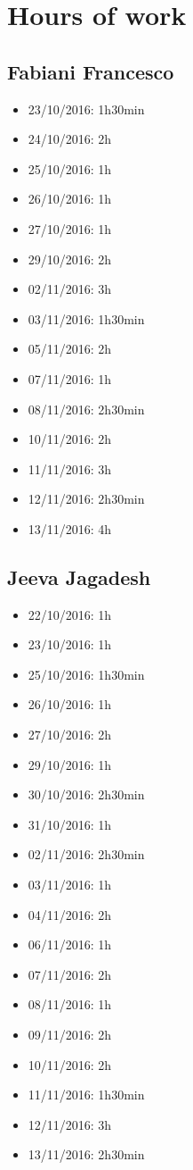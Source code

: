 \chapter{Hours of work}

\section*{Fabiani Francesco}
\begin{itemize}
	\item 23/10/2016: 1h30min
	\item 24/10/2016: 2h
	\item 25/10/2016: 1h
	\item 26/10/2016: 1h
	\item 27/10/2016: 1h
	\item 29/10/2016: 2h
	\item 02/11/2016: 3h
	\item 03/11/2016: 1h30min
	\item 05/11/2016: 2h
	\item 07/11/2016: 1h
	\item 08/11/2016: 2h30min
	\item 10/11/2016: 2h
	\item 11/11/2016: 3h
	\item 12/11/2016: 2h30min
	\item 13/11/2016: 4h
\end{itemize}

\section*{Jeeva Jagadesh}
\begin{itemize}
	\item 22/10/2016: 1h
	\item 23/10/2016: 1h
	\item 25/10/2016: 1h30min
	\item 26/10/2016: 1h
	\item 27/10/2016: 2h
	\item 29/10/2016: 1h
	\item 30/10/2016: 2h30min
	\item 31/10/2016: 1h
	\item 02/11/2016: 2h30min
	\item 03/11/2016: 1h
	\item 04/11/2016: 2h
	\item 06/11/2016: 1h
	\item 07/11/2016: 2h
	\item 08/11/2016: 1h
	\item 09/11/2016: 2h
	\item 10/11/2016: 2h
	\item 11/11/2016: 1h30min
	\item 12/11/2016: 3h
	\item 13/11/2016: 2h30min
\end{itemize}

